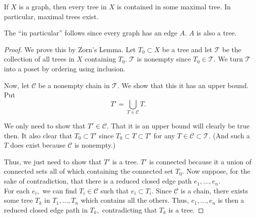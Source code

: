 \documentclass[12pt]{article}
\begin{document}
\begin{thm} \label{thm:treecontainedinmaximal}
	If $X$ is a graph, then every tree in $X$ is contained in some maximal tree. In particular, maximal trees exist.
\end{thm}
The ``in particular'' follows since every graph has an edge $A.$ $A$ is also a tree.
\begin{proof} 
	We prove this by Zorn's Lemma. Let $T_0 \subset X$ be a tree and let $\mathcal{T}$ be the collection of all trees in $X$ containing $T_0.$ $\mathcal{T}$ is nonempty since $T_0 \in \mathcal{T}.$ We turn $\mathcal{T}$ into a poset by ordering using inclusion.

	Now, let $\mathcal{C}$ be a nonempty chain in $\mathcal{T}.$ We show that this it has an upper bound. Put
	\begin{equation*} 
		T' = \bigcup_{T \in \mathcal{C}} T.
	\end{equation*}

	We only need to show that $T' \in \mathcal{C}.$ That it is an upper bound will clearly be true then. It also clear that $T_0 \subset T'$ since $T_0 \subset T \subset T'$ for any $T \in \mathcal{C} \subset \mathcal{T}.$ (And such a $T$ does exist because $\mathcal{C}$ is nonempty.)

	Thus, we just need to show that $T'$ is a tree. $T'$ is connected because it a union of connected sets all of which containing the connected set $T_0.$ Now suppose, for the sake of contradiction, that there is a reduced closed edge path $e_1, \ldots, e_n.$\\
	For each $e_i,$ we can find $T_i \in \mathcal{C}$ such that $e_i \subset T_i.$ Since $\mathcal{C}$ is a chain, there exists some tree $T_k$ in $T_1, \ldots, T_n$ which contains all the others. Thus, $e_1, \ldots, e_n$ is then a reduced closed edge path in $T_k,$ contradicting that $T_k$ is a tree.
\end{proof}
\end{document}
